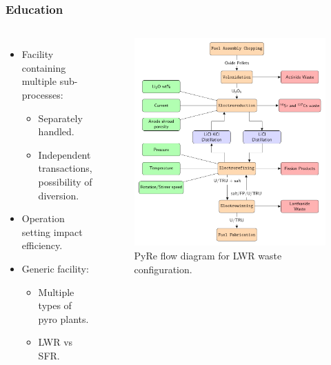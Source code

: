 \begin{frame}
	\frametitle{Education}
	\begin{columns}
		\column[t]{5cm}
		\begin{itemize}
			\item Facility containing multiple sub-processes:
			\begin{itemize}
				\item Separately handled.
				\item Independent transactions, possibility of diversion.
			\end{itemize}
			\item Operation setting impact efficiency.
			\item Generic facility:
			\begin{itemize}
				\item Multiple types of pyro plants.
				\item LWR vs SFR.
			\end{itemize}
		\end{itemize}
		\column[t]{6cm}
		\begin{figure}
			\includegraphics[width=\linewidth]{./images/westphal-pyre.pdf}
			\caption{PyRe flow diagram for LWR waste configuration.}
			\label{fig:pyre}
		\end{figure}
	\end{columns}
\end{frame}

